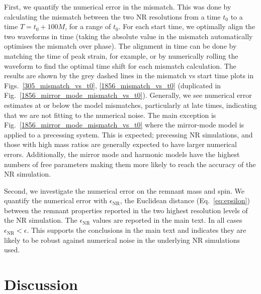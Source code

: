 First, we quantify the numerical error in the mismatch.
This was done by calculating the mismatch between the two NR resolutions from a time $t_0$ to a time $T = t_0 + 100M$, for a range of $t_0$. For each start time, we optimally align the two waveforms in time (taking the absolute value in the mismatch automatically optimises the mismatch over phase). The alignment in time can be done by matching the time of peak strain, for example, or by numerically rolling the waveform to find the optimal time shift for each mismatch calculation.
The results are shown by the grey dashed lines in the mismatch vs start time plots in Figs.~\ref{305_mismatch_vs_t0}, \ref{1856_mismatch_vs_t0} (duplicated in Fig.~\ref{1856_mirror_mode_mismatch_vs_t0}). %
Generally, we see numerical error estimates at or below the model mismatches, particularly at late times, indicating that we are not fitting to the numerical noise.
The main exception is Fig.~\ref{1856_mirror_mode_mismatch_vs_t0} where the mirror-mode model is applied to a precessing system. This is expected; precessing NR simulations, and those with high mass ratios are generally expected to have larger numerical errors. Additionally, the mirror mode and harmonic models have the highest numbers of free parameters making them more likely to reach the accuracy of the NR simulation. 

Second, we investigate the numerical error on the remnant mass and spin.
We quantify the numerical error with $\epsilon_{\mathrm{NR}}$, the Euclidean distance (Eq.~\ref{eq:epsilon}) between the remnant properties reported in the two highest resolution levels of the NR simulation.
The $\epsilon_{\mathrm{NR}}$ values are reported in the main text. %
In all cases $\epsilon_{\mathrm{NR}} < \epsilon$. This supports the conclusions in the main text and indicates they are likely to be robust against numerical noise in the underlying NR simulations used.


\section{Discussion} \label{sec:discussion}

